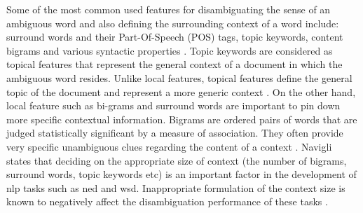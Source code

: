 Some of the most common used features for disambiguating the sense of an ambiguous word and also defining the surrounding context of a word include: surround words and their Part-Of-Speech (POS) tags, topic keywords, content bigrams and various syntactic properties \cite{36}. Topic keywords are considered as topical features that represent the general context of a document in which the ambiguous word resides. Unlike local features, topical features define the general topic of the document and represent a more generic context \cite{30}. On the other hand, local feature such as bi-grams and surround words are important to pin down more specific contextual information. Bigrams are ordered pairs of words that are judged statistically significant by a measure of association. They often provide very specific unambiguous clues regarding the content of a context \cite{26}. Navigli \cite{30} states that deciding on the appropriate size of context (the number of bigrams, surround words, topic keywords etc) is an important factor in the development of \ac{nlp} tasks such as \ac{ned} and \ac{wsd}. Inappropriate formulation of the context size is known to negatively affect the disambiguation performance of these tasks \cite{30}. 

